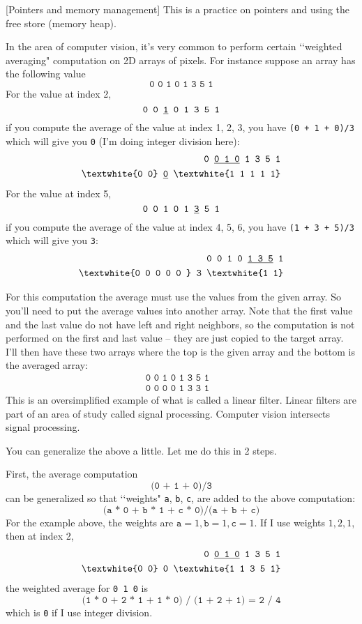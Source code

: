   [Pointers and memory management]
This is a practice on pointers and using the free store (memory heap).

In the area of computer vision, it's very common to perform
certain \lq\lq weighted averaging" computation on 2D arrays of pixels.
For instance suppose an array has the following value
\[
\texttt{0 0 1 0 1 3 5 1}
\]
For the value at index 2, 
\[
\texttt{0 0 \underline{1} 0 1 3 5 1}
\]
if you compute the average of the value at index 1, 2, 3, you have
\verb!(0 + 1 + 0)/3! which will give you \verb!0! (I'm doing
integer division here):
\begin{align*}
\texttt{0 \underline{0 1 0} 1 3 5 1} & \\
\texttt{\textwhite{0 0} \underline{0} \textwhite{1 1 1 1 1}} &
\end{align*}
For the value at index 5, 
\[
\texttt{0 0 1 0 1 \underline{3} 5 1}
\]
if you compute the average of the value at index 4, 5, 6, you have
\verb!(1 + 3 + 5)/3! which will give you \verb!3!:
\begin{align*}
\texttt{0 0 1 0 \underline{1 3 5} 1} & \\
\texttt{\textwhite{0 0 0 0 0 } 3 \textwhite{1 1}} &
\end{align*}

For this computation the average must use the values from the given array.
So you'll need to put the average values into another array.
Note that the first value and the last value do not have left and right
neighbors, so the computation is not performed on the first and last value
-- they are just copied to the target array.
I'll then have these two arrays where the top is the given array
and the bottom is the averaged array:
\begin{align*}
\texttt{0 0 1 0 1 3 5 1} & \\
\texttt{0 0 0 0 1 3 3 1} &
\end{align*}
This is an oversimplified example of what is called a linear
filter.
Linear filters are part of an area of study called signal processing.
Computer vision intersects signal processing.

You can generalize the above a little.
Let me do this in 2 steps.

First,
the average computation
\[
\texttt{(0 + 1 + 0)/3}
\]
can be generalized so that \lq\lq weights"
\verb!a!,
\verb!b!,
\verb!c!,
are added to the above computation:
\[
\texttt{(a * 0 + b * 1 + c * 0)/(a + b + c)}
\]
For the example above, the weights are
$\texttt{a}=1,\texttt{b}=1,\texttt{c}=1$.
If I use weights $1,2,1$, then at index 2,
\begin{align*}
\texttt{0 \underline{0 1 0} 1 3 5 1} & \\
\texttt{\textwhite{0 0} 0 \textwhite{1 1 3 5 1}} &
\end{align*}
the weighted average for \verb!0 1 0! is
\[
\texttt{(1 * 0 + 2 * 1 + 1 * 0) / (1 + 2 + 1) = 2 / 4}
\]
which is \verb!0! if I use integer division.

